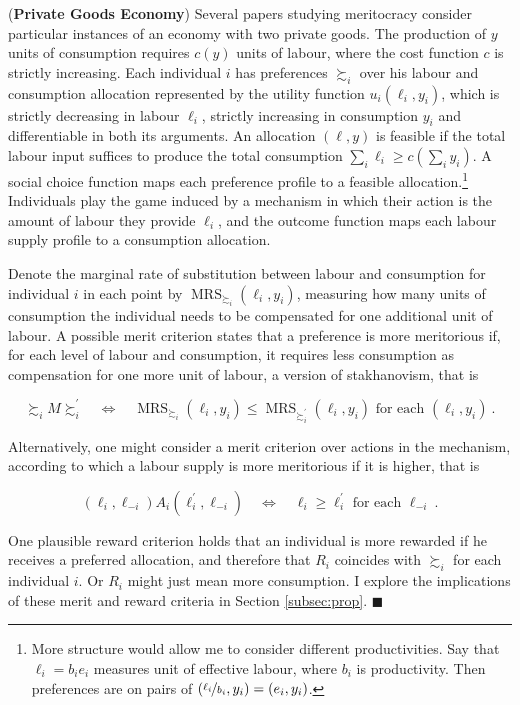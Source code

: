 \begin{example} \label{ex:priv}
	 (\textbf{Private Goods Economy}) Several papers studying meritocracy \citep{andreShallowMeritocracy2024,cappelenMeritocraticOriginEgalitarian2022,cappelenMeritPrimacyEffect2023,cappelenFairnessLimitedInformation2024,fleurbaeyFairnessResponsibilityWelfare2008} consider particular instances of an economy with two private goods. The production of \( y \) units of consumption requires \( c ( y ) \) units of labour, where the cost function \( c \) is strictly increasing. Each individual \( i \) has preferences \( \succsim_i \) over his labour and consumption allocation represented by the utility function \( u_i ( \ell_i, y_i ) \), which is strictly decreasing in labour \( \ell_i \), strictly increasing in consumption \( y_i \) and differentiable in both its arguments. An allocation  \( ( \ell, y ) \) is feasible if the total labour input suffices to produce the total consumption \( \sum_{i} \ell_i \geq c ( \sum_i y_i ) \). A social choice function maps each preference profile to a feasible allocation.\footnote{More structure would allow me to consider different productivities. Say that \( \ell_i = b_i e_i \) measures unit of effective labour, where \( b_i \) is productivity. Then preferences are on pairs of \( ( \nicefrac{\ell_i}{b_i}, y_i ) = ( e_i, y_i ) \).} Individuals play the game induced by a mechanism in which their action is the amount of labour they provide \( \ell_i \), and the outcome function maps each labour supply profile to a consumption allocation.

	Denote the marginal rate of substitution between labour and consumption for individual \( i \) in each point by \( \operatorname{MRS}_{\succsim_i} ( \ell_i, y_i ) \), measuring how many units of consumption the individual needs to be compensated for one additional unit of labour. A possible merit criterion states that a preference is more meritorious if, for each level of labour and consumption, it requires less consumption as compensation for one more unit of labour, a version of stakhanovism, that is

	\[ \succsim_i M \succsim_i^{\prime} \quad \Longleftrightarrow \quad \operatorname{MRS}_{\succsim_i} ( \ell_i, y_i ) \leq \operatorname{MRS}_{\succsim_i^{\prime}} ( \ell_i, y_i ) \text{ for each } ( \ell_i, y_i ) \: .\]

	Alternatively, one might consider a merit criterion over actions in the mechanism, according to which a labour supply is more meritorious if it is higher, that is

	\[ ( \ell_i, \ell_{-i} ) A_i ( \ell^{\prime}_i, \ell_{-i} ) \quad \Longleftrightarrow \quad  \ell_i \geq \ell^{\prime}_i \text{ for each } \ell_{-i} \: .\]

	One plausible reward criterion holds that an individual is more rewarded if he receives a preferred allocation, and therefore that \( R_i \) coincides with \( \succsim_i \) for each individual \( i \). Or \( R_i \) might just mean more consumption. I explore the implications of these merit and reward criteria in Section \ref{subsec:prop}. \hfill \( \blacksquare \)
\end{example}

